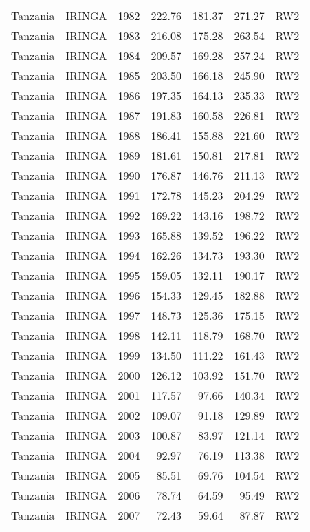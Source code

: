 \begin{longtable}{lllrrrl}
  Tanzania & IRINGA & 1982 & 222.76 & 181.37 & 271.27 & RW2 \\ 
  Tanzania & IRINGA & 1983 & 216.08 & 175.28 & 263.54 & RW2 \\ 
  Tanzania & IRINGA & 1984 & 209.57 & 169.28 & 257.24 & RW2 \\ 
  Tanzania & IRINGA & 1985 & 203.50 & 166.18 & 245.90 & RW2 \\ 
  Tanzania & IRINGA & 1986 & 197.35 & 164.13 & 235.33 & RW2 \\ 
  Tanzania & IRINGA & 1987 & 191.83 & 160.58 & 226.81 & RW2 \\ 
  Tanzania & IRINGA & 1988 & 186.41 & 155.88 & 221.60 & RW2 \\ 
  Tanzania & IRINGA & 1989 & 181.61 & 150.81 & 217.81 & RW2 \\ 
  Tanzania & IRINGA & 1990 & 176.87 & 146.76 & 211.13 & RW2 \\ 
  Tanzania & IRINGA & 1991 & 172.78 & 145.23 & 204.29 & RW2 \\ 
  Tanzania & IRINGA & 1992 & 169.22 & 143.16 & 198.72 & RW2 \\ 
  Tanzania & IRINGA & 1993 & 165.88 & 139.52 & 196.22 & RW2 \\ 
  Tanzania & IRINGA & 1994 & 162.26 & 134.73 & 193.30 & RW2 \\ 
  Tanzania & IRINGA & 1995 & 159.05 & 132.11 & 190.17 & RW2 \\ 
  Tanzania & IRINGA & 1996 & 154.33 & 129.45 & 182.88 & RW2 \\ 
  Tanzania & IRINGA & 1997 & 148.73 & 125.36 & 175.15 & RW2 \\ 
  Tanzania & IRINGA & 1998 & 142.11 & 118.79 & 168.70 & RW2 \\ 
  Tanzania & IRINGA & 1999 & 134.50 & 111.22 & 161.43 & RW2 \\ 
  Tanzania & IRINGA & 2000 & 126.12 & 103.92 & 151.70 & RW2 \\ 
  Tanzania & IRINGA & 2001 & 117.57 & 97.66 & 140.34 & RW2 \\ 
  Tanzania & IRINGA & 2002 & 109.07 & 91.18 & 129.89 & RW2 \\ 
  Tanzania & IRINGA & 2003 & 100.87 & 83.97 & 121.14 & RW2 \\ 
  Tanzania & IRINGA & 2004 & 92.97 & 76.19 & 113.38 & RW2 \\ 
  Tanzania & IRINGA & 2005 & 85.51 & 69.76 & 104.54 & RW2 \\ 
  Tanzania & IRINGA & 2006 & 78.74 & 64.59 & 95.49 & RW2 \\ 
  Tanzania & IRINGA & 2007 & 72.43 & 59.64 & 87.87 & RW2 \\ 

\end{longtable}
